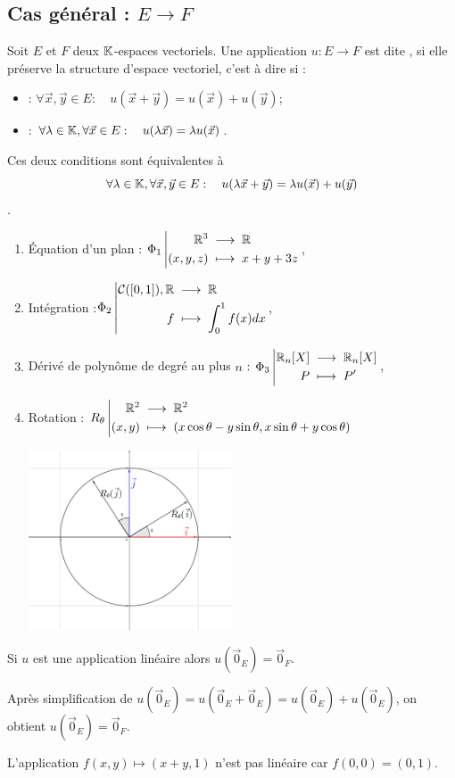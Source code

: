 \documentclass{book}
\begin{document}
\subsection{Cas général : $E\to F$ }

\begin{DefinitionProposition}
Soit $E$ et $F$ deux $\mathbb{K} $-espaces vectoriels.
Une application $u:E\to F$ est dite , si  elle préserve la structure d'espace vectoriel, c'est à dire si :
\begin{itemize}
\item
   : $\forall   \vec{x},\vec{y}\in  E:\quad u(\vec{x}+\vec{y}) = u(\vec{x}) + u(\vec{y})$;
\item
   : $\forall   \lambda \in  \mathbb{K},\forall   \vec{x}\in  E:\quad u(\lambda \vec{x}) = \lambda u(\vec{x})$.
\end{itemize}
Ces deux conditions sont équivalentes à
$$\forall   \lambda  \in  \mathbb{K} , \forall   \vec{x},\vec{y}\in  E:\quad u(\lambda \vec{x} +  \vec{y}) = \lambda u(\vec{x}) +  u(\vec{y})$$.
\end{DefinitionProposition}
\begin{Exemple} 
\begin{enumerate}
\item Équation d'un plan : ${\Phi _1}\left|\begin{aligned}{\mathbb {R}^3 }&\;\longrightarrow\;{\mathbb {R}}\\{(x,y,z)}&\;\longmapsto\;{x+y+3z}\end{aligned}\right.$,
\item Intégration :${\Phi _2}\left|\begin{aligned}{\mathcal{C}([0,1]),  \mathbb {R} }&\;\longrightarrow\;{\mathbb {R}}\\{f}&\;\longmapsto\;{\int_0^1 f(x)dx}\end{aligned}\right.$,
\item Dérivé de polynôme de degré au plus $n$ : ${\Phi _3}\left|\begin{aligned}{\mathbb {R}_n[X] }&\;\longrightarrow\;{\mathbb {R}_n[X]}\\{P}&\;\longmapsto\;{P'}\end{aligned}\right.$,
\item Rotation : ${R_\theta}\left|\begin{aligned}{\mathbb {R}^2 }&\;\longrightarrow\;{\mathbb {R}^2}\\{(x,y)}&\;\longmapsto\;{ (x\cos \theta - y \sin \theta,x\sin \theta + y \cos \theta)}\end{aligned}\right.$
\begin{center}
\includegraphics[width=6cm]{rotation.png}
\end{center}
\end{enumerate}
\end{Exemple}
\begin{Proposition}
Si $u$ est une application linéaire alors $u(\vec{0}_E)=\vec{0}_F$.
\end{Proposition}
\begin{Demonstration}
Après simplification de $u(\vec{0}_E)=u(\vec{0}_E+\vec{0}_E)=u(\vec{0}_E)+u(\vec{0}_E)$, on obtient $u(\vec{0}_E)=\vec{0}_F$.
\end{Demonstration}
\begin{Exemple} 
L'application $f(x,y)\mapsto (x+y,1)$ n'est pas linéaire car $f(0,0)=(0,1).$
\end{Exemple}
\end{document}

